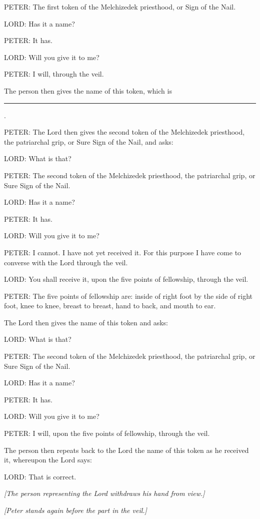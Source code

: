 			PETER: The first token of the Melchizedek priesthood, or Sign of the Nail.

			LORD: Has it a name?

			PETER: It has.

			LORD: Will you give it to me?

			PETER: I will, through the veil.

			The person then gives the name of this token, which is \rule{1cm}{0.15mm}.

			PETER: The Lord then gives the second token of the Melchizedek priesthood, the patriarchal grip, or Sure Sign of the Nail, and asks:

			LORD: What is that?

			PETER: The second token of the Melchizedek priesthood, the patriarchal grip, or Sure Sign of the Nail.

			LORD: Has it a name?

			PETER: It has.

			LORD: Will you give it to me?

			PETER: I cannot. I have not yet received it. For this purpose I have come to converse with the Lord through the veil.

			LORD: You shall receive it, upon the five points of fellowship, through the veil.

			PETER: The five points of fellowship are: inside of right foot by the side of right foot, knee to knee, breast to breast, hand to back, and mouth to ear.

			The Lord then gives the name of this token and asks:

			LORD: What is that?

			PETER: The second token of the Melchizedek priesthood, the patriarchal grip, or Sure Sign of the Nail.

			LORD: Has it a name?

			PETER: It has.

			LORD: Will you give it to me?

			PETER: I will, upon the five points of fellowship, through the veil.

			The person then repeats back to the Lord the name of this token as he received it, whereupon the Lord says:

			LORD: That is correct.

			\textit{[The person representing the Lord withdraws his hand from view.]}

			\textit{[Peter stands again before the part in the veil.]}

